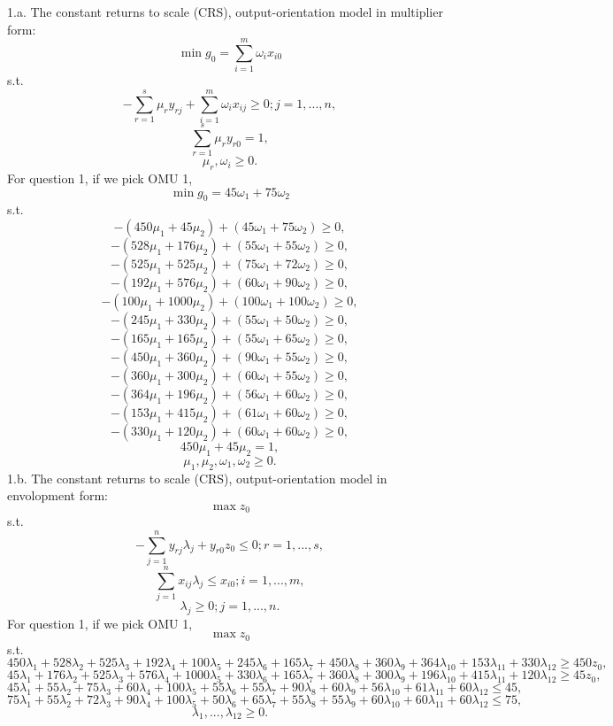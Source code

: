 \documentclass{article}
\begin{document}
1.a. The constant returns to scale (CRS), output-orientation model in multiplier form:
$$ \min{g_0} = \sum_{i=1}^m \omega_i x_{i0} $$
s.t.
$$ - \sum_{r=1}^s \mu_r y_{rj} + \sum_{i=1}^m \omega_i x_{ij} \geq 0; j = 1, ..., n, $$
$$ \sum_{r=1}^s \mu_r y_{r0} = 1, $$
$$ \mu_r, \omega_i \geq 0. $$
For question 1, if we pick OMU 1,
$$ \min{g_0} = 45 \omega_1 + 75 \omega_2 $$
s.t.
$$ - (450 \mu_1 + 45 \mu_2) + (45 \omega_1 + 75 \omega_2) \geq 0, $$
$$ - (528 \mu_1 + 176 \mu_2) + (55 \omega_1 + 55 \omega_2) \geq 0, $$
$$ - (525 \mu_1 + 525 \mu_2) + (75 \omega_1 + 72 \omega_2) \geq 0, $$
$$ - (192 \mu_1 + 576 \mu_2) + (60 \omega_1 + 90 \omega_2) \geq 0, $$
$$ - (100 \mu_1 + 1000 \mu_2) + (100 \omega_1 + 100 \omega_2) \geq 0, $$
$$ - (245 \mu_1 + 330 \mu_2) + (55 \omega_1 + 50 \omega_2) \geq 0, $$
$$ - (165 \mu_1 + 165 \mu_2) + (55 \omega_1 + 65 \omega_2) \geq 0, $$
$$ - (450 \mu_1 + 360 \mu_2) + (90 \omega_1 + 55 \omega_2) \geq 0, $$
$$ - (360 \mu_1 + 300 \mu_2) + (60 \omega_1 + 55 \omega_2) \geq 0, $$
$$ - (364 \mu_1 + 196 \mu_2) + (56 \omega_1 + 60 \omega_2) \geq 0, $$
$$ - (153 \mu_1 + 415 \mu_2) + (61 \omega_1 + 60 \omega_2) \geq 0, $$
$$ - (330 \mu_1 + 120 \mu_2) + (60 \omega_1 + 60 \omega_2) \geq 0, $$
$$ 450 \mu_1 + 45 \mu_2 = 1, $$
$$ \mu_1, \mu_2, \omega_1, \omega_2 \geq 0. $$
\newpage
1.b. The constant returns to scale (CRS), output-orientation model in envolopment form:
$$ \max{z_0} $$
s.t.
$$ - \sum_{j = 1}^n y_{rj} \lambda_j + y_{r0} z_0 \leq 0; r = 1, ..., s, $$
$$ \sum_{j=1}^n x_{ij} \lambda_j \leq x_{i0}; i = 1, ..., m, $$
$$ \lambda_j \geq 0; j = 1, ..., n. $$
For question 1, if we pick OMU 1,
$$ \max{z_0} $$
s.t.
$$ 450 \lambda_1 + 528 \lambda_2 + 525 \lambda_3 + 192 \lambda_4 + 100 \lambda_5 + 245 \lambda_6 + 165 \lambda_7 + 450 \lambda_8 + 360 \lambda_9 + 364 \lambda_{10} + 153 \lambda_{11} + 330 \lambda_{12} \geq 450 z_0, $$
$$ 45 \lambda_1 + 176 \lambda_2 + 525 \lambda_3 + 576 \lambda_4 + 1000 \lambda_5 + 330 \lambda_6 + 165 \lambda_7 + 360 \lambda_8 + 300 \lambda_9 + 196 \lambda_{10} + 415 \lambda_{11} + 120 \lambda_{12} \geq 45 z_0, $$
$$ 45 \lambda_1 + 55 \lambda_2 + 75 \lambda_3 + 60 \lambda_4 + 100 \lambda_5 + 55 \lambda_6 + 55 \lambda_7 + 90 \lambda_8 + 60 \lambda_9 + 56 \lambda_{10} + 61 \lambda_{11} + 60 \lambda_{12} \leq 45, $$
$$ 75 \lambda_1 + 55 \lambda_2 + 72 \lambda_3 + 90 \lambda_4 + 100 \lambda_5 + 50 \lambda_6 + 65 \lambda_7 + 55 \lambda_8 + 55 \lambda_9 + 60 \lambda_{10} + 60 \lambda_{11} + 60 \lambda_{12} \leq 75, $$
$$ \lambda_1, ..., \lambda_{12} \geq 0. $$
\end{document}
